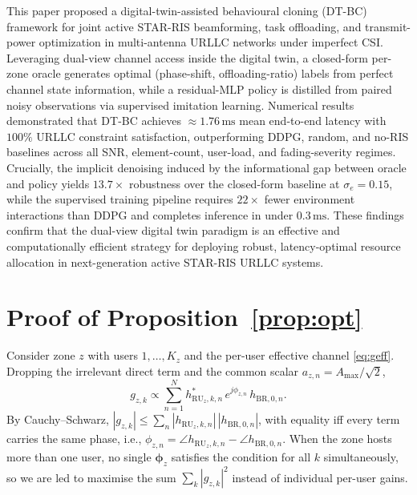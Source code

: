 \documentclass[journal]{IEEEtran}
\newcommand{\vect}[1]{\bm{#1}}
\begin{document}
This paper proposed a digital-twin-assisted behavioural cloning
(DT-BC) framework for joint active STAR-RIS beamforming, task
offloading, and transmit-power optimization in multi-antenna URLLC
networks under imperfect CSI. Leveraging dual-view channel access
inside the digital twin, a closed-form per-zone oracle generates
optimal (phase-shift, offloading-ratio) labels from perfect
channel state information, while a residual-MLP policy is distilled
from paired noisy observations via supervised imitation learning.
Numerical results demonstrated that DT-BC achieves
$\approx\!1.76\,\text{ms}$ mean end-to-end latency with
$100\%$ URLLC constraint satisfaction, outperforming DDPG,
random, and no-RIS baselines across all SNR, element-count,
user-load, and fading-severity regimes. Crucially, the
implicit denoising induced by the informational gap between
oracle and policy yields $13.7\!\times$ robustness over the
closed-form baseline at $\sigma_e\!=\!0.15$, while the
supervised training pipeline requires $22\!\times$ fewer
environment interactions than DDPG and completes inference
in under $0.3\,\text{ms}$. These findings confirm that the
dual-view digital twin paradigm is an effective and
computationally efficient strategy for deploying robust,
latency-optimal resource allocation in next-generation
active STAR-RIS URLLC systems.

\appendices
\section{Proof of Proposition~\ref{prop:opt}}
\label{app:proof}

Consider zone $z$ with users $1,\ldots,K_z$ and the per-user
effective channel \eqref{eq:geff}. Dropping the irrelevant direct
term and the common scalar $a_{z,n}\!=\!A_{\max}/\sqrt{2}$,
\begin{equation*}
  g_{z,k}\propto \sum_{n=1}^{N} h_{\mathrm{RU}_z,k,n}^*\,
                                   e^{j\phi_{z,n}}\,h_{\mathrm{BR},0,n}.
\end{equation*}
By Cauchy--Schwarz,
$|g_{z,k}|\le \sum_n |h_{\mathrm{RU}_z,k,n}|\,|h_{\mathrm{BR},0,n}|$,
with equality iff every term carries the same phase, i.e.,
$\phi_{z,n}=\angle h_{\mathrm{RU}_z,k,n}-\angle h_{\mathrm{BR},0,n}$.
When the zone hosts more than one user, no single $\vect{\phi}_z$
satisfies the condition for all $k$ simultaneously, so we are led
to maximise the sum $\sum_k |g_{z,k}|^2$ instead of individual
per-user gains.
\end{document}
